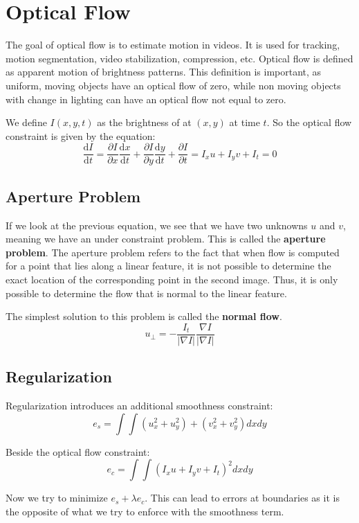 \section{Optical Flow}

The goal of optical flow is to estimate motion in videos. It is used for tracking, motion segmentation, video stabilization, compression, etc. Optical flow is defined as apparent motion of brightness patterns. This definition is important, as uniform, moving objects have an optical flow of zero, while non moving objects with change in lighting can have an optical flow not equal to zero. \medskip

We define $I(x,y,t)$ as the brightness of at $(x,y)$ at time $t$. So the optical flow constraint is given by the equation:
$$\frac{\mathrm{d} I}{\mathrm{d} t} = \frac{\partial I}{\partial x} \frac{\mathrm{d} x}{\mathrm{d} t} + \frac{\partial I}{\partial y} \frac{\mathrm{d} y}{\mathrm{d} t} + \frac{\partial I}{\partial t} = I_x u + I_y v + I_t = 0$$


\subsection{Aperture Problem}

If we look at the previous equation, we see that we have two unknowns $u$ and $v$, meaning we have an under constraint problem. This is called the \textbf{aperture problem}. The aperture problem refers to the fact that when flow is computed for a point that lies along a linear feature, it is not possible to determine the exact location of the corresponding point in the second image. Thus, it is only possible to determine the flow that is normal to the linear feature. \medskip

The simplest solution to this problem is called the \textbf{normal flow}.
$$u_\bot = - \frac{I_t}{|\nabla I|} \frac{\nabla I}{|\nabla I|}$$


\subsection{Regularization}

Regularization introduces an additional smoothness constraint:
$$e_s = \int \int (u_x^2 + u_y^2) + (v_x^2 + v_y^2) dxdy$$

Beside the optical flow constraint:
$$e_c = \int \int (I_x u + I_y v + I_t)^2 dx dy$$

Now we try to minimize $e_s + \lambda e_c$. This can lead to errors at boundaries as it is the opposite of what we try to enforce with the smoothness term.


